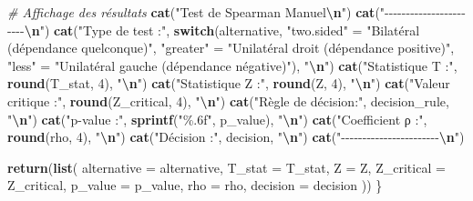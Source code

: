 \documentclass[
  12pt,
]{article}
\newenvironment{Shaded}{\begin{snugshade}}{\end{snugshade}}
\newcommand{\AttributeTok}[1]{\textcolor[rgb]{0.13,0.29,0.53}{#1}}
\newcommand{\CommentTok}[1]{\textcolor[rgb]{0.56,0.35,0.01}{\textit{#1}}}
\newcommand{\ControlFlowTok}[1]{\textcolor[rgb]{0.13,0.29,0.53}{\textbf{#1}}}
\newcommand{\DecValTok}[1]{\textcolor[rgb]{0.00,0.00,0.81}{#1}}
\newcommand{\FunctionTok}[1]{\textcolor[rgb]{0.13,0.29,0.53}{\textbf{#1}}}
\newcommand{\NormalTok}[1]{#1}
\newcommand{\OtherTok}[1]{\textcolor[rgb]{0.56,0.35,0.01}{#1}}
\newcommand{\SpecialCharTok}[1]{\textcolor[rgb]{0.81,0.36,0.00}{\textbf{#1}}}
\newcommand{\StringTok}[1]{\textcolor[rgb]{0.31,0.60,0.02}{#1}}
\begin{document}
\begin{Shaded}
\begin{Highlighting}[]
  \CommentTok{\# Affichage des résultats}
  \FunctionTok{cat}\NormalTok{(}\StringTok{"Test de Spearman Manuel}\SpecialCharTok{\textbackslash{}n}\StringTok{"}\NormalTok{)}
  \FunctionTok{cat}\NormalTok{(}\StringTok{"{-}{-}{-}{-}{-}{-}{-}{-}{-}{-}{-}{-}{-}{-}{-}{-}{-}{-}{-}{-}{-}{-}{-}}\SpecialCharTok{\textbackslash{}n}\StringTok{"}\NormalTok{)}
  \FunctionTok{cat}\NormalTok{(}\StringTok{"Type de test    :"}\NormalTok{, }\ControlFlowTok{switch}\NormalTok{(alternative, }\StringTok{"two.sided"} \OtherTok{=} \StringTok{"Bilatéral (dépendance quelconque)"}\NormalTok{, }\StringTok{"greater"} \OtherTok{=} \StringTok{"Unilatéral droit (dépendance positive)"}\NormalTok{, }\StringTok{"less"} \OtherTok{=} \StringTok{"Unilatéral gauche (dépendance négative)"}\NormalTok{), }\StringTok{"}\SpecialCharTok{\textbackslash{}n}\StringTok{"}\NormalTok{)}
  \FunctionTok{cat}\NormalTok{(}\StringTok{"Statistique T   :"}\NormalTok{, }\FunctionTok{round}\NormalTok{(T\_stat, }\DecValTok{4}\NormalTok{), }\StringTok{"}\SpecialCharTok{\textbackslash{}n}\StringTok{"}\NormalTok{)}
  \FunctionTok{cat}\NormalTok{(}\StringTok{"Statistique Z   :"}\NormalTok{, }\FunctionTok{round}\NormalTok{(Z, }\DecValTok{4}\NormalTok{), }\StringTok{"}\SpecialCharTok{\textbackslash{}n}\StringTok{"}\NormalTok{)}
  \FunctionTok{cat}\NormalTok{(}\StringTok{"Valeur critique :"}\NormalTok{, }\FunctionTok{round}\NormalTok{(Z\_critical, }\DecValTok{4}\NormalTok{), }\StringTok{"}\SpecialCharTok{\textbackslash{}n}\StringTok{"}\NormalTok{)}
  \FunctionTok{cat}\NormalTok{(}\StringTok{"Règle de décision:"}\NormalTok{, decision\_rule, }\StringTok{"}\SpecialCharTok{\textbackslash{}n}\StringTok{"}\NormalTok{)}
  \FunctionTok{cat}\NormalTok{(}\StringTok{"p{-}value         :"}\NormalTok{, }\FunctionTok{sprintf}\NormalTok{(}\StringTok{"\%.6f"}\NormalTok{, p\_value), }\StringTok{"}\SpecialCharTok{\textbackslash{}n}\StringTok{"}\NormalTok{)}
  \FunctionTok{cat}\NormalTok{(}\StringTok{"Coefficient ρ   :"}\NormalTok{, }\FunctionTok{round}\NormalTok{(rho, }\DecValTok{4}\NormalTok{), }\StringTok{"}\SpecialCharTok{\textbackslash{}n}\StringTok{"}\NormalTok{)}
  \FunctionTok{cat}\NormalTok{(}\StringTok{"Décision        :"}\NormalTok{, decision, }\StringTok{"}\SpecialCharTok{\textbackslash{}n}\StringTok{"}\NormalTok{)}
  \FunctionTok{cat}\NormalTok{(}\StringTok{"{-}{-}{-}{-}{-}{-}{-}{-}{-}{-}{-}{-}{-}{-}{-}{-}{-}{-}{-}{-}{-}{-}{-}}\SpecialCharTok{\textbackslash{}n}\StringTok{"}\NormalTok{)}
  
  \FunctionTok{return}\NormalTok{(}\FunctionTok{list}\NormalTok{(}
    \AttributeTok{alternative =}\NormalTok{ alternative,}
    \AttributeTok{T\_stat =}\NormalTok{ T\_stat,}
    \AttributeTok{Z =}\NormalTok{ Z,}
    \AttributeTok{Z\_critical =}\NormalTok{ Z\_critical,}
    \AttributeTok{p\_value =}\NormalTok{ p\_value,}
    \AttributeTok{rho =}\NormalTok{ rho,}
    \AttributeTok{decision =}\NormalTok{ decision}
\NormalTok{  ))}
\NormalTok{\}}
\end{Highlighting}
\end{Shaded}
\end{document}
